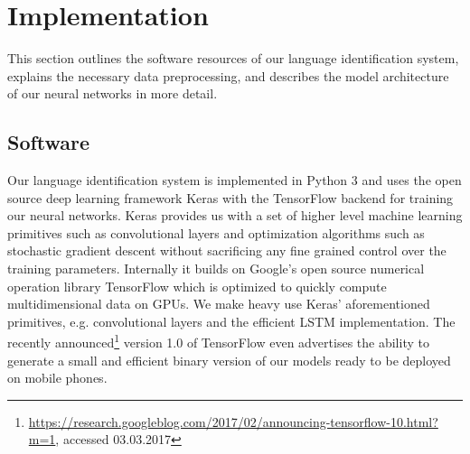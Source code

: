 \section{Implementation}
\label{sec:implementation}
This section outlines the software resources of our language identification system, explains the necessary data preprocessing, and describes the model architecture of our neural networks in more detail.

\subsection{Software}
\label{sec:software}

	Our language identification system is implemented in Python 3 and uses the open source deep learning framework Keras\cite{chollet2015keras} with the TensorFlow\cite{abadi2016tensorflow} backend for training our neural networks. Keras provides us with a set of higher level machine learning primitives such as convolutional layers and optimization algorithms such as stochastic gradient descent without sacrificing any fine grained control over the training parameters. Internally it builds on Google's open source numerical operation library TensorFlow which is optimized to quickly compute multidimensional data on GPUs. We make heavy use Keras' aforementioned primitives, e.g. convolutional layers and the efficient LSTM implementation. The recently announced\footnote{\url{https://research.googleblog.com/2017/02/announcing-tensorflow-10.html?m=1}, accessed 03.03.2017} version 1.0 of TensorFlow even advertises the ability to generate a small and efficient binary version of our models ready to be deployed on mobile phones.
	
